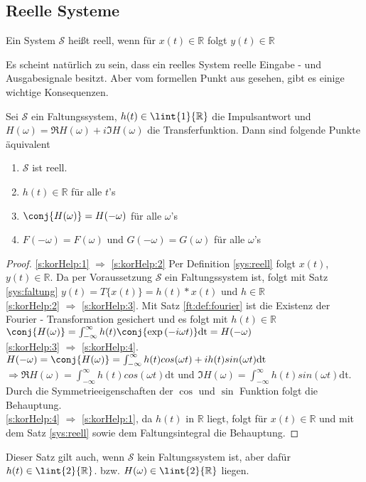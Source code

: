 \subsection{Reelle Systeme}
\begin{defi}\label{sys:reell}
	Ein System $\mathscr{S}$ heißt reell, wenn für $x(t) \in \mathbb{R}$ folgt $y(t) \in \mathbb{R}$
\end{defi}
Es scheint natürlich zu sein, dass ein reelles System reelle Eingabe - und Ausgabesignale besitzt. Aber vom formellen Punkt aus gesehen, gibt es einige wichtige Konsequenzen.

\begin{lemma}\label{s:korHelp} 
Sei $\mathscr{S}$ ein Faltungssystem, $h(t) \in \lint{1}{\mathbb{R}}$ die Impulsantwort und $H(\omega) = \Re{H(\omega)} + i \Im{H(\omega)}$ die Transferfunktion. Dann sind folgende Punkte äquivalent
\begin{enumerate}[label=\roman*]
	\item \label{s:korHelp:1} $\mathscr{S}$ ist reell.
	\item \label{s:korHelp:2} $h(t) \in \mathbb{R}$ für alle $t$'s
	\item \label{s:korHelp:3} $\conj{H(\omega)} = H(-\omega)$ für alle $\omega$'s
	\item \label{s:korHelp:4} $F(-\omega) = F(\omega)$ und $G(-\omega) = G(\omega)$ für alle $\omega$'s
\end{enumerate}
\begin{proof}
	\ref{s:korHelp:1} $\Rightarrow$ \ref{s:korHelp:2} Per Definition \ref{sys:reell} folgt $x(t)$, $y(t) \in \mathbb{R} $. Da per Voraussetzung $\mathscr{S}$ ein Faltungssystem ist, folgt mit Satz \ref{sys:faltung} 
	$y(t) = T\{x(t)\} = h(t) * x(t)$ und $h \in \mathbb{R}$\\
	\ref{s:korHelp:2} $\Rightarrow$ \ref{s:korHelp:3}. Mit Satz \ref{ft:def:fourier} ist die Existenz der Fourier - Transformation gesichert und es folgt mit $h(t) \in \mathbb{R}$
	$\conj{H(\omega)} = \int_{-\infty}^{\infty}h(t) \conj{\exp{(-i \omega t)}} \mathrm{dt} = H(-\omega)$\\
	\ref{s:korHelp:3} $\Rightarrow$ \ref{s:korHelp:4}. $H(-\omega) = \conj{H(\omega)} = \int_{-\infty}^{\infty}h(t) cos(\omega t) + i h(t) sin(\omega t) \mathrm{dt}$
	$\Rightarrow \Re{H(\omega)} = \int_{-\infty}^{\infty}h(t) cos(\omega t) \mathrm{dt}$ und 
	$\Im{H(\omega)} = \int_{-\infty}^{\infty}h(t) sin(\omega t) \mathrm{dt}$. Durch die Symmetrieeigenschaften der $\cos$ und $\sin$ Funktion folgt die Behauptung.\\
	\ref{s:korHelp:4} $\Rightarrow$ \ref{s:korHelp:1}, da $h(t)$ in $\mathbb{R}$ liegt, folgt für $x(t) \in \mathbb{R}$ und mit dem Satz \ref{sys:reell} sowie dem Faltungsintegral die Behauptung.
\end{proof}
\end{lemma}
\begin{bem}
Dieser Satz gilt auch, wenn $\mathscr{S}$ kein Faltungssystem ist, aber dafür $h(t) \in \lint{2}{\mathbb{R}}$. bzw. $H(\omega) \in \lint{2}{\mathbb{R}}$ liegen.
\end{bem}
